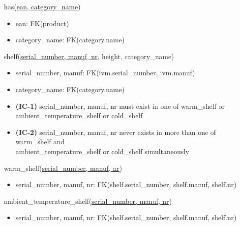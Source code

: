 \documentclass[12pt,a4paper]{article}
\begin{document}
  \vspace*{10pt}

  \noindent
  has(\underline{ean, category\_name})
  \begin{itemize}[nosep]
    \item ean: FK(product)
    \item category\_name: FK(category.name)
  \end{itemize}


  \vspace*{10pt}

  \noindent
  shelf(\underline{serial\_number, manuf, nr}, height, category\_name)
  \begin{itemize}[nosep]
    \item serial\_number, manuf: FK(ivm.serial\_number, ivm.manuf)
    \item category\_name: FK(category.name)
    \item \textsf{\textbf{(IC-1)}} serial\_number, manuf, nr \textsf{must exist in one of} warm\_shelf \textsf{or}\\ ambient\_temperature\_shelf \textsf{or} cold\_shelf
    \item \textsf{\textbf{(IC-2)}} serial\_number, manuf, nr \textsf{never exists in more than one of} warm\_shelf \textsf{and}\\ ambient\_temperature\_shelf \textsf{or} cold\_shelf \textsf{simultaneously}
  \end{itemize}

  \vspace*{10pt}

  \noindent
  warm\_shelf(\underline{serial\_number, manuf, nr})
  \begin{itemize}[nosep]
    \item serial\_number, manuf, nr: FK(shelf.serial\_number, shelf.manuf, shelf.nr)
  \end{itemize}

  \vspace*{10pt}

  \noindent
  ambient\_temperature\_shelf(\underline{serial\_number, manuf, nr})
  \begin{itemize}[nosep]
    \item serial\_number, manuf, nr: FK(shelf.serial\_number, shelf.manuf, shelf.nr)
  \end{itemize}

  \vspace*{10pt}
\end{document}
